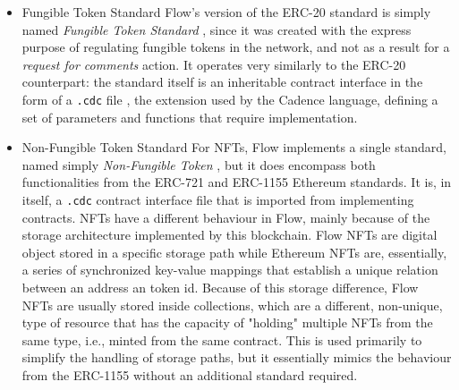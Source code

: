 \documentclass[../main.tex]{subfiles}
\begin{document}
\begin{itemize}
    \item {Fungible Token Standard} Flow's version of the ERC-20 standard is simply named \textit{Fungible Token Standard} \cite{Dapper2022a}, since it was created with the express purpose of regulating fungible tokens in the network, and not as a result for a \textit{request for comments} action. It operates very similarly to the ERC-20 counterpart: the standard itself is an inheritable contract interface in the form of a \verb|.cdc| file \cite{Dapper2022c}, the extension used by the Cadence language, defining a set of parameters and functions that require implementation.

    \item {Non-Fungible Token Standard} For NFTs, Flow implements a single standard, named simply \textit{Non-Fungible Token} \cite{Dapper2022b}, but it does encompass both functionalities from the ERC-721 and ERC-1155 Ethereum standards. It is, in itself, a \verb|.cdc| \cite{Dapper2022d} contract interface file that is imported from implementing contracts. NFTs have a different behaviour in Flow, mainly because of the storage architecture implemented by this blockchain. Flow NFTs are digital object stored in a specific storage path while Ethereum NFTs are, essentially, a series of synchronized key-value mappings that establish a unique relation between an address an token id. Because of this storage difference, Flow NFTs are usually stored inside collections, which are a different, non-unique, type of resource that has the capacity of "holding" multiple NFTs from the same type, i.e., minted from the same contract. This is used primarily to simplify the handling of storage paths, but it essentially mimics the behaviour from the ERC-1155 without an additional standard required.


\end{itemize}
\end{document}
